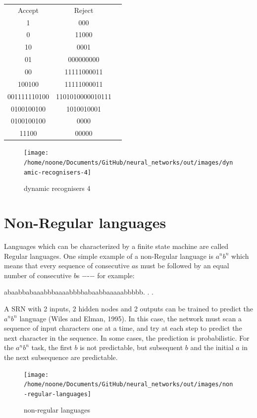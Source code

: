 \documentclass[11pt]{article}
\begin{document}
\begin{center}
\begin{tabular}{ |c|c|c| }
 \hline
 Accept & Reject \\
 1 & 000 \\
 0 & 11000 \\
 10 & 0001 \\
 01 & 000000000 \\
 00 & 11111000011 \\
 100100 & 11111000011 \\
 001111110100 & 1101010000010111 \\
 0100100100 & 1010010001 \\
 0100100100 & 0000 \\
 11100 & 00000 \\
 \hline
\end{tabular}
\end{center}

\begin{figure}[h]
    \centering
    \texttt{[image: /home/noone/Documents/GitHub/neural\_networks/out/images/dynamic-recognisers-4]}
    \caption[dynamic recognisers 4]{dynamic recognisers 4}
    \label{fig: dynamic recognisers 4}
\end{figure}


\section{Non-Regular languages}\label{sec:non-regular-languages}

    Languages which can be characterized by a finite state machine are called Regular languages.
One simple example of a non-Regular language is $a^n b^n$ which means that every sequence of consecutive $a$s must be followed by an equal number of consecutive $b$s −-− for example:

abaabbabaaabbbaaaabbbbabaabbaaaaabbbbb. . .

A SRN with 2 inputs, 2 hidden nodes and 2 outputs can be trained to predict the $a^n b^n$ language (Wiles and Elman, 1995).
In this case, the network must scan a sequence of input characters one at a time, and try at each step to predict the next character in the sequence.
In some cases, the prediction is probabilistic.
For the $a^n b^n$ task, the first $b$ is not predictable, but subsequent $b$ and the initial $a$ in the next subsequence are predictable.

    \begin{figure}[h]
    \centering
    \texttt{[image: /home/noone/Documents/GitHub/neural\_networks/out/images/non-regular-languages]}
    \caption[non-regular languages]{non-regular languages}
    \label{fig: non-regular languages}
    \end{figure}
\end{document}
